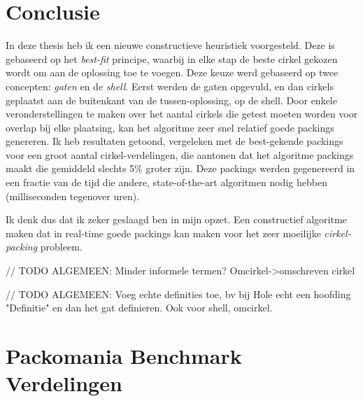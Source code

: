 \documentclass[12pt,a4paper,oneside]{book}
\begin{document}
\chapter{Conclusie} \label{chap:conclusie}

In deze thesis heb ik een nieuwe constructieve heuristiek voorgesteld.
Deze is gebaseerd op het \textit{best-fit} principe, waarbij in elke stap de beste cirkel gekozen wordt om aan de oplossing toe te voegen.
Deze keuze werd gebaseerd op twee concepten: \textit{gaten} en de \textit{shell}.
Eerst werden de gaten opgevuld, en dan cirkels geplaatst aan de buitenkant van de tussen-oplossing, op de shell.
Door enkele veronderstellingen te maken over het aantal cirkels die getest moeten worden voor overlap bij elke plaatsing, kan het algoritme zeer snel relatief goede packings genereren.
Ik heb resultaten getoond, vergeleken met de best-gekende packings voor een groot aantal cirkel-verdelingen, die aantonen dat het algoritme packings maakt die gemiddeld slechts 5\% groter zijn.
Deze packings werden gegenereerd in een fractie van de tijd die andere, state-of-the-art algoritmen nodig hebben (milliseconden tegenover uren).

Ik denk dus dat ik zeker geslaagd ben in mijn opzet.
Een constructief algoritme maken dat in real-time goede packings kan maken voor het zeer moeilijke \textit{cirkel-packing} probleem.

// TODO ALGEMEEN: Minder informele termen? Omcirkel->omschreven cirkel

// TODO ALGEMEEN: Voeg echte definities toe, bv bij Hole echt een hoofding "Definitie" en dan het gat definieren. Ook voor shell, omcirkel.

\newpage


\appendix

\chapter{Packomania Benchmark Verdelingen} \label{append:packomania-benchmark-verdelingen}
\end{document}
